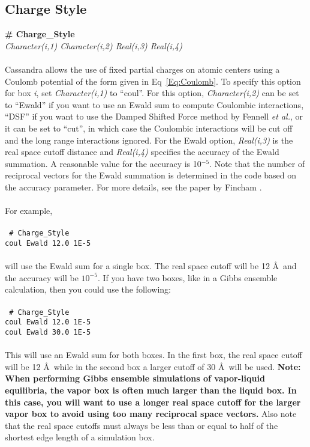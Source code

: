 \subsection{Charge Style}\label{sec:Charge_Style}
{\bf \# Charge\_Style} \\
{\it Character(i,1) Character(i,2) Real(i,3) Real(i,4)} \\ \\
%
Cassandra allows the use of fixed partial charges on atomic centers
using a Coulomb potential of the form given in Eq~\ref{Eq:Coulomb}. To
specify this option for box {\em i}, set {\it Character(i,1)} to
``coul''. For this option,
{\it Character(i,2)} can be set to ``Ewald'' if you want to use
an Ewald sum to compute Coulombic interactions, ``DSF'' if you want to use
the Damped Shifted Force method by Fennell \textit{et al.}\cite{Fennell:2006}, or it can be set to
``cut'', in which case the Coulombic interactions will be cut off and
the long range interactions ignored. For the Ewald option, 
{\it Real(i,3)} is the real space cutoff distance and {\it Real(i,4)}
specifies the accuracy of the Ewald summation. A reasonable value for
the accuracy is 10$^{-5}$. Note that the number of reciprocal vectors
for the Ewald summation is determined in the code based on the
accuracy parameter. For more details, see the paper by Fincham
\cite{Fincham:1994}.\\ \\ 
%
For example,
\\ \\
\texttt{
\# Charge\_Style \\
coul Ewald 12.0 1E-5}\\ \\
will use the Ewald sum for a single box. The real space cutoff will be
12 \AA\ and the accuracy will be $10^{-5}$. If you have two boxes,
like in a Gibbs ensemble calculation, then you could use the
following:
\\ \\
\texttt{
\# Charge\_Style \\
coul Ewald 12.0 1E-5\\
coul Ewald 30.0 1E-5}
\\ \\ 
This will use an Ewald sum for both boxes. In the first box, the real
space cutoff will be 12 \AA\ while in the second box a larger cutoff
of 30 \AA\ will be used. {\bf Note: When performing Gibbs ensemble
  simulations of vapor-liquid equilibria, the vapor box is often much
  larger than the liquid box. In this case, you will want to use a
  longer real space cutoff for the larger vapor box to avoid using too
  many reciprocal space vectors.} Also note that the real space
cutoffs must always be less than or equal to half of the shortest edge
length of a simulation box. \\ 

